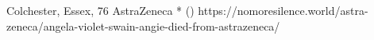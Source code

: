           {Colchester, Essex, }
          {76}
          {AstraZeneca}
          {*}
          {
             ()
          }
          {https://nomoresilence.world/astra-zeneca/angela-violet-swain-angie-died-from-astrazeneca/}

